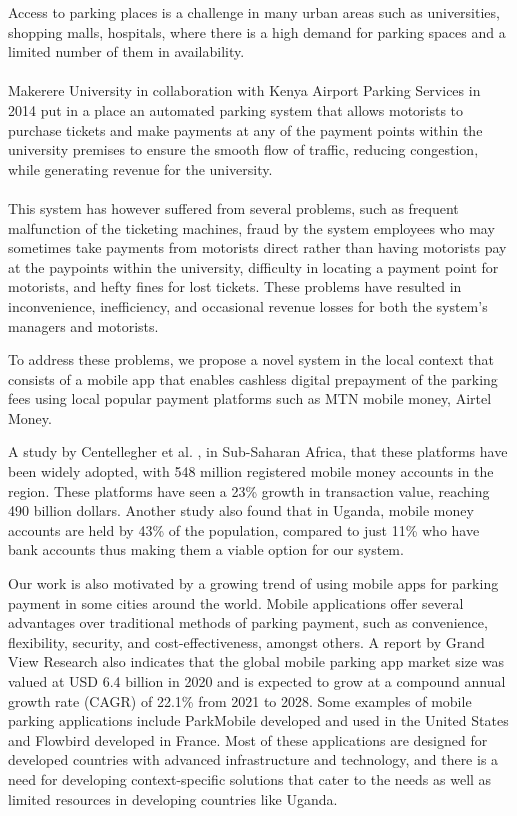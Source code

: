 Access to parking places is a challenge in many urban areas such as universities, shopping malls, hospitals, where there is a high demand for parking spaces and a limited number of them in availability\cite{parmar_study_2020}.\\\\
Makerere University in collaboration with Kenya Airport Parking Services in 2014 put in a place an automated parking system that allows motorists to purchase tickets and make payments at any of the payment points within the university premises to ensure the smooth flow of traffic, reducing congestion, while generating revenue for the university\cite{wamai_mak_2014}.\\\\ This system has however suffered from several problems, such as frequent malfunction of the ticketing machines, fraud by the system employees who may sometimes take payments from motorists direct rather than having motorists pay at the paypoints within the university, difficulty in locating a payment point for motorists, and hefty fines for lost tickets. These problems have resulted in inconvenience, inefficiency, and occasional revenue losses for both the system’s managers and motorists.

To address these problems, we propose a novel system in the local context that consists of a mobile app that enables cashless digital prepayment of the parking fees using local popular payment platforms such as MTN mobile money, Airtel Money.

A study by Centellegher et al. \cite{centellegher_mobile_2018}, in Sub-Saharan Africa, that these platforms have been widely adopted, with 548 million registered mobile money accounts in the region. These platforms have seen a 23\% growth in transaction value, reaching 490 billion dollars. Another study also found that in Uganda, mobile money accounts are held by 43\% of the population, compared to just 11\% who have bank accounts\cite{baah_state_2021} thus making them a viable option for our system.

Our work is also motivated by a growing trend of using mobile apps for parking payment in some cities around the world. Mobile applications offer several advantages over traditional methods of parking payment, such as convenience, flexibility, security, and cost-effectiveness, amongst others. A report by Grand View Research also indicates that the global mobile parking app market size was valued at USD 6.4 billion in 2020 and is expected to grow at a compound annual growth rate (CAGR) of 22.1\% from 2021 to 2028\cite{GrandViewResearch2023}. Some examples of mobile parking applications include ParkMobile \cite{ParkMobile2023} developed and used in the United States and Flowbird developed in France\cite{Flowbird2023}. Most of these applications are designed for developed countries with advanced infrastructure and technology, and there is a need for developing context-specific solutions that cater to the needs as well as limited resources in developing countries like Uganda.


